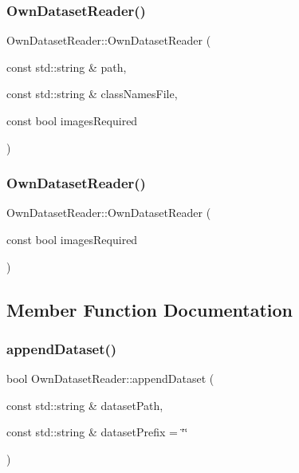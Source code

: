 \subsubsection{\texorpdfstring{Own\+Dataset\+Reader()}{OwnDatasetReader()}\hspace{0.1cm}{\footnotesize\ttfamily [1/2]}}
{\footnotesize\ttfamily Own\+Dataset\+Reader\+::\+Own\+Dataset\+Reader (\begin{DoxyParamCaption}\item[{const std\+::string \&}]{path,  }\item[{const std\+::string \&}]{class\+Names\+File,  }\item[{const bool}]{images\+Required }\end{DoxyParamCaption})}

\mbox{\label{class_own_dataset_reader_afdc8088f6fa4482075c3c61bd2b96aab}} 
\subsubsection{\texorpdfstring{Own\+Dataset\+Reader()}{OwnDatasetReader()}\hspace{0.1cm}{\footnotesize\ttfamily [2/2]}}
{\footnotesize\ttfamily Own\+Dataset\+Reader\+::\+Own\+Dataset\+Reader (\begin{DoxyParamCaption}\item[{const bool}]{images\+Required }\end{DoxyParamCaption})}



\subsection{Member Function Documentation}
\mbox{\label{class_own_dataset_reader_aaae1790f8ee3efd504fbf17ec717b640}} 
\subsubsection{\texorpdfstring{append\+Dataset()}{appendDataset()}}
{\footnotesize\ttfamily bool Own\+Dataset\+Reader\+::append\+Dataset (\begin{DoxyParamCaption}\item[{const std\+::string \&}]{dataset\+Path,  }\item[{const std\+::string \&}]{dataset\+Prefix = {\ttfamily \char`\"{}\char`\"{}} }\end{DoxyParamCaption})\hspace{0.3cm}{\ttfamily [virtual]}}




